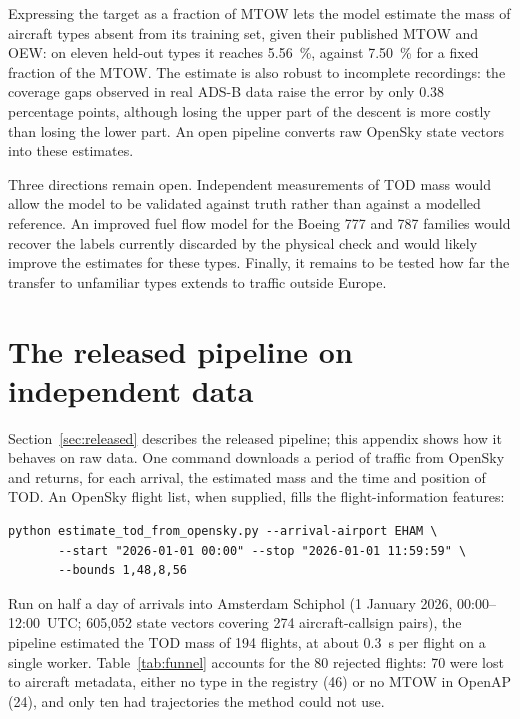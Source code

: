 \documentclass[
  manuscript=proceedings,  %
  layout=preprint,  %
  year=2026,
  volume=x,
]{extra/joas}
\begin{document}
Expressing the target as a fraction of MTOW lets the model estimate the mass of aircraft types absent from its training set, given their published MTOW and OEW: on eleven held-out types it reaches 5.56~\%, against 7.50~\% for a fixed fraction of the MTOW. The estimate is also robust to incomplete recordings: the coverage gaps observed in real ADS-B data raise the error by only 0.38 percentage points, although losing the upper part of the descent is more costly than losing the lower part. An open pipeline converts raw OpenSky state vectors into these estimates.

Three directions remain open. Independent measurements of TOD mass would allow the model to be validated against truth rather than against a modelled reference. An improved fuel flow model for the Boeing 777 and 787 families would recover the labels currently discarded by the physical check and would likely improve the estimates for these types. Finally, it remains to be tested how far the transfer to unfamiliar types extends to traffic outside Europe.


\appendix

\section{The released pipeline on independent data}
\label{app:pipeline}

Section~\ref{sec:released} describes the released pipeline; this appendix shows how it behaves on raw data. One command downloads a period of traffic from OpenSky and returns, for each arrival, the estimated mass and the time and position of TOD. An OpenSky flight list, when supplied, fills the flight-information features:

\begin{verbatim}
python estimate_tod_from_opensky.py --arrival-airport EHAM \
       --start "2026-01-01 00:00" --stop "2026-01-01 11:59:59" \
       --bounds 1,48,8,56
\end{verbatim}

\noindent Run on half a day of arrivals into Amsterdam Schiphol (1 January 2026, 00:00--12:00~UTC; 605{,}052 state vectors covering 274 aircraft-callsign pairs), the pipeline estimated the TOD mass of 194 flights, at about 0.3~s per flight on a single worker. Table~\ref{tab:funnel} accounts for the 80 rejected flights: 70 were lost to aircraft metadata, either no type in the registry (46) or no MTOW in OpenAP (24), and only ten had trajectories the method could not use.
\end{document}
